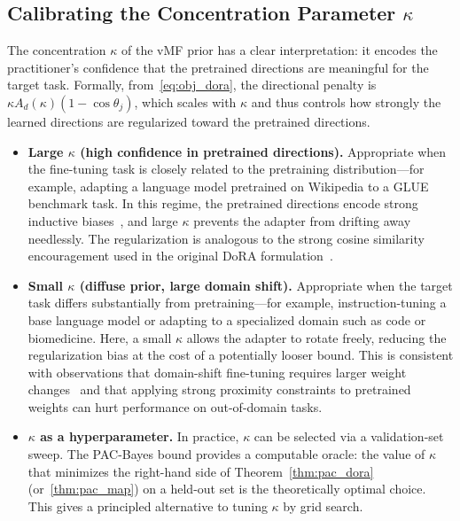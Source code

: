 \documentclass[11pt]{article}
\begin{document}
\subsection{Calibrating the Concentration Parameter $\kappa$}
\label{sec:disc_kappa}

The concentration $\kappa$ of the vMF prior has a clear interpretation:
it encodes the practitioner's confidence that the pretrained directions
are meaningful for the target task.
Formally, from~\eqref{eq:obj_dora}, the directional penalty is
$\kappa A_d(\kappa)(1 - \cos\theta_j)$, which scales with $\kappa$ and
thus controls how strongly the learned directions are regularized toward
the pretrained directions.

\begin{itemize}
  \item \textbf{Large $\kappa$ (high confidence in pretrained directions).}
    Appropriate when the fine-tuning task is closely related to the
    pretraining distribution---for example, adapting a language model
    pretrained on Wikipedia to a GLUE benchmark task.
    In this regime, the pretrained directions encode strong inductive
    biases~\cite{vu2020exploring}, and large $\kappa$ prevents the adapter
    from drifting away needlessly.
    The regularization is analogous to the strong cosine similarity
    encouragement used in the original DoRA formulation~\cite{liu2024dora}.

  \item \textbf{Small $\kappa$ (diffuse prior, large domain shift).}
    Appropriate when the target task differs substantially from
    pretraining---for example, instruction-tuning a base language model
    or adapting to a specialized domain such as code or biomedicine.
    Here, a small $\kappa$ allows the adapter to rotate freely, reducing
    the regularization bias at the cost of a potentially looser bound.
    This is consistent with observations that domain-shift fine-tuning
    requires larger weight changes~\cite{tanwar2025domain} and that
    applying strong proximity constraints to pretrained weights can
    hurt performance on out-of-domain tasks.

  \item \textbf{$\kappa$ as a hyperparameter.}
    In practice, $\kappa$ can be selected via a validation-set sweep.
    The PAC-Bayes bound provides a computable oracle: the value of
    $\kappa$ that minimizes the right-hand side of
    Theorem~\ref{thm:pac_dora} (or~\ref{thm:pac_map}) on a held-out set
    is the theoretically optimal choice.
    This gives a principled alternative to tuning $\kappa$ by grid search.
\end{itemize}
\end{document}
